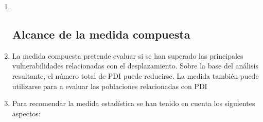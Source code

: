 \documentclass[
]{book}
\begin{document}
\begin{enumerate}
\item ~
  \hypertarget{alcance-de-la-medida-compuesta}{%
  \subsection{Alcance de la medida compuesta}\label{alcance-de-la-medida-compuesta}}
\item
  La medida compuesta pretende evaluar si se han superado las principales vulnerabilidades relacionadas con el desplazamiento. Sobre la base del análisis resultante, el número total de PDI puede reducirse. La medida también puede utilizarse para a evaluar las poblaciones relacionadas con PDI
\item
  Para recomendar la medida estadística se han tenido en cuenta los siguientes aspectos:
\end{enumerate}
\end{document}
